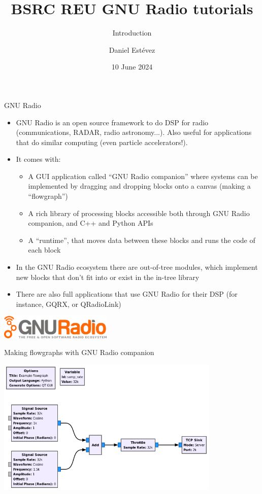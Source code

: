 \documentclass[aspectratio=169]{beamer}
\date{10 June 2024}
\title{BSRC REU GNU Radio tutorials}
\subtitle{Introduction}
\author{Daniel Estévez}
\institute
{}
\begin{document}
\frame{\titlepage}

\begin{frame}{GNU Radio}
  \begin{itemize}
    \item GNU Radio is an open source framework to do DSP for radio
      (communications, RADAR, radio astronomy...). Also useful for applications
      that do similar computing (even particle accelerators!).
    \item It comes with:
      \begin{itemize}
        \item A GUI application called ``GNU Radio companion'' where
             systems can be implemented by dragging and dropping blocks onto a
             canvas (making a ``flowgraph'')
        \item A rich library of processing blocks accessible both through GNU Radio
          companion, and C++ and Python APIs
        \item A ``runtime'', that moves data between these blocks and runs the
          code of each block
      \end{itemize}
    \item In the GNU Radio ecosystem there are out-of-tree modules, which
      implement new blocks that don't fit into or exist in the in-tree library
    \item There are also full applications that use GNU Radio for their DSP (for
      instance, GQRX, or QRadioLink)
  \end{itemize}
  \includegraphics[width=0.4\textwidth]{gnuradio_logo}
\end{frame}

\begin{frame}{Making flowgraphs with GNU Radio companion}
  \begin{center}
    \includegraphics[width=0.8\textwidth]{example_flowgraph}
  \end{center}
\end{frame}
\end{document}
